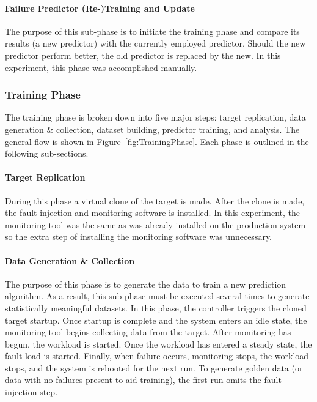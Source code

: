 \paragraph{Failure Predictor (Re-)Training and Update}
The purpose of this sub-phase is to initiate the training phase and compare its
results (a new predictor) with the currently employed predictor.  Should the
new predictor perform better, the old predictor is replaced by the new.  In
this experiment, this phase was accomplished manually.

\subsubsection{Training Phase}
The training phase is broken down into five major steps:  target replication,
data generation \& collection, dataset building, predictor training, and
analysis.  The general flow is shown in Figure~\ref{fig:TrainingPhase}.  Each
phase is outlined in the following sub-sections.


\paragraph{Target Replication}
During this phase a virtual clone of the target is made.  After the clone is
made, the fault injection and monitoring software is installed.  In this
experiment, the monitoring tool was the same as was already installed on the
production system so the extra step of installing the monitoring software was
unnecessary.

\paragraph{Data Generation \& Collection}
The purpose of this phase is to generate the data to train a new prediction
algorithm.  As a result, this sub-phase must be executed several times to
generate statistically meaningful datasets.  In this phase, the controller
triggers the cloned target startup.  Once startup is complete and the system
enters an idle state, the monitoring tool begins collecting data from the
target.  After monitoring has begun, the workload is started.  Once the
workload has entered a steady state, the fault load is started.  Finally, when
failure occurs, monitoring stops, the workload stops, and the system is
rebooted for the next run.  To generate golden data (or data with no failures
present to aid training), the first run omits the fault injection step.

